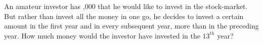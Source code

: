 
%
%
%
%
% 
\question[4]  An amateur investor has ,000 that he would like to invest in the
stock-market. But rather than invest all the money in one go, he decides to invest 
a certain amount in the first year and in every subsequent year,  more than
in the preceding year. How much money would the investor have invested in the $13^{th}$ year?


\ifprintanswers
\fi 

